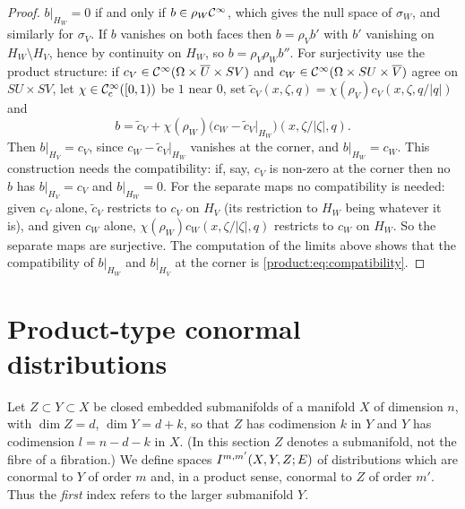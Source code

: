 \begin{proof}
$b|_{H_W}=0$ if and only if $b\in\rho_W\mathcal{C}^\infty$, which gives the null space of
$\sigma_W$, and similarly for $\sigma_V$. If $b$ vanishes on both faces then
$b=\rho_Vb'$ with $b'$ vanishing on $H_W\setminus H_V$, hence by continuity on
$H_W$, so $b=\rho_V\rho_Wb''$. For surjectivity use the product structure: if
$c_V\in\mathcal{C}^\infty(\Omega\times\overline{U}\times SV)$ and $c_W\in\mathcal{C}^\infty(\Omega\times SU\times\overline{V})$
agree on $SU\times SV$, let $\chi\in\mathcal{C}^\infty_{\mathrm{c}}([0,1))$ be $1$ near $0$, set
$\tilde c_V(x,\zeta,q)=\chi(\rho_V)c_V(x,\zeta,q/|q|)$ and
\begin{equation*}
b=\tilde c_V+\chi(\rho_W)\big(c_W-\tilde c_V|_{H_W}\big)(x,\zeta/|\zeta|,q).
\end{equation*}
Then $b|_{H_V}=c_V$, since $c_W-\tilde c_V|_{H_W}$ vanishes at the corner, and
$b|_{H_W}=c_W$. This construction needs the compatibility: if, say, $c_V$ is
non-zero at the corner then no $b$ has $b|_{H_V}=c_V$ and $b|_{H_W}=0$. For the
separate maps no compatibility is needed: given $c_V$ alone, $\tilde c_V$ restricts
to $c_V$ on $H_V$ (its restriction to $H_W$ being whatever it is), and given $c_W$
alone, $\chi(\rho_W)c_W(x,\zeta/|\zeta|,q)$ restricts to $c_W$ on $H_W$. So the
separate maps are surjective. The computation of the limits above shows
that the compatibility of $b|_{H_W}$ and $b|_{H_V}$ at the corner is
\eqref{product:eq:compatibility}.
\end{proof}

\section{Product-type conormal distributions}\label{product:sec:conormal}

Let $Z\subset Y\subset X$ be closed embedded submanifolds of a manifold $X$ of
dimension $n$, with $\dim Z=d$, $\dim Y=d+k$, so that $Z$ has codimension $k$ in $Y$
and $Y$ has codimension $l=n-d-k$ in $X$. (In this section $Z$ denotes a
submanifold, not the fibre of a fibration.) We define spaces
$I^{m,m'}(X,Y,Z;E)$ of distributions which are conormal to $Y$ of order $m$ and,
in a product sense, conormal to $Z$ of order $m'$. Thus the \emph{first} index
refers to the larger submanifold $Y$.

